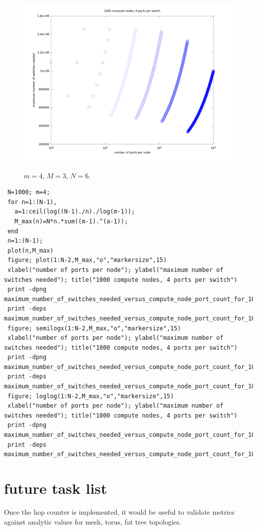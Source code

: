 \documentclass[pdftex]{article}
\begin{document}
\begin{figure}[h!]
\begin{center}
\includegraphics[scale=.3]{pictures/maximum_number_of_switches_needed_versus_compute_node_port_count_for_1000_compute_nodes_and_4_ports_per_switch_semilogx}
\label{fig:max}
 \caption{$m=4$, $M=3$, $N=6$.}
\end{center}
\end{figure}
\begin{verbatim}
 N=1000; m=4; 
 for n=1:(N-1),
   a=1:ceil(log((N-1)./n)./log(m-1));
   M_max(n)=N*n.*sum((m-1).^(a-1));
 end
 n=1:(N-1);
 plot(n,M_max)
 figure; plot(1:N-2,M_max,"o","markersize",15)
 xlabel("number of ports per node"); ylabel("maximum number of switches needed"); title("1000 compute nodes, 4 ports per switch")
 print -dpng maximum_number_of_switches_needed_versus_compute_node_port_count_for_1000_compute_nodes_and_4_ports_per_switch.png
 print -deps maximum_number_of_switches_needed_versus_compute_node_port_count_for_1000_compute_nodes_and_4_ports_per_switch.eps
 figure; semilogx(1:N-2,M_max,"o","markersize",15)
 xlabel("number of ports per node"); ylabel("maximum number of switches needed"); title("1000 compute nodes, 4 ports per switch")
 print -dpng maximum_number_of_switches_needed_versus_compute_node_port_count_for_1000_compute_nodes_and_4_ports_per_switch_semilogx.png
 print -deps maximum_number_of_switches_needed_versus_compute_node_port_count_for_1000_compute_nodes_and_4_ports_per_switch_semilogx.eps
 figure; loglog(1:N-2,M_max,"o","markersize",15)
 xlabel("number of ports per node"); ylabel("maximum number of switches needed"); title("1000 compute nodes, 4 ports per switch")
 print -dpng maximum_number_of_switches_needed_versus_compute_node_port_count_for_1000_compute_nodes_and_4_ports_per_switch_loglog.png
 print -deps maximum_number_of_switches_needed_versus_compute_node_port_count_for_1000_compute_nodes_and_4_ports_per_switch_loglog.eps
\end{verbatim}
 

\section{future task list}

Once the hop counter is implemented, it would be useful to validate metrics against analytic values for mesh, torus, fat tree topologies.
\end{document}

